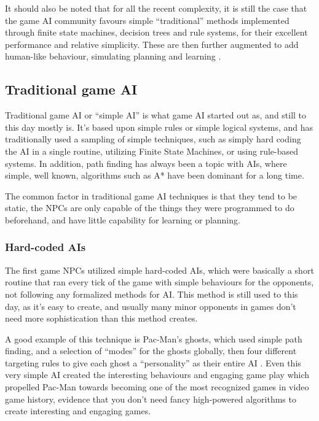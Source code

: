 It should also be noted that for all the recent complexity, it is still the case
that the game AI community favours simple ``traditional'' methods implemented
through finite state machines, decision trees and rule systems, for their
excellent performance and relative simplicity. These are then further augmented
to add human-like behaviour, simulating planning and learning
\citep[see][]{orkin2003applying,isla2002new,khoo2002efficient,mateas2002behavior}.

\subsection{Traditional game AI}
\label{sec:traditional-game-ai}

Traditional game AI or ``simple AI'' is what game AI started out as, and still
to this day mostly is. It's based upon simple rules or simple logical systems,
and has traditionally used a sampling of simple techniques, such as simply hard
coding the AI in a single routine, utilizing Finite State Machines, or using
rule-based systems. In addition, path finding has always been a topic with AIs,
where simple, well known, algorithms such as A* have been dominant for a long
time.

The common factor in traditional game AI techniques is that they tend to be
static, the NPCs are only capable of the things they were programmed to do
beforehand, and have little capability for learning or planning.

\subsubsection{Hard-coded AIs}
\label{sec:hard-coded-ais}

The first game NPCs utilized simple hard-coded AIs, which were basically a short
routine that ran every tick of the game with simple behaviours for the
opponents, not following any formalized methods for AI. This method is still
used to this day, as it's easy to create, and usually many minor opponents in
games don't need more sophistication than this method creates.

A good example of this technique is Pac-Man's ghosts, which used simple path
finding, and a selection of ``modes'' for the ghosts globally, then four
different targeting rules to give each ghost a ``personality'' as their entire
AI \citep{birch2010pacman,pittmanpac}. Even this very simple AI created the
interesting behaviours and engaging game play which propelled Pac-Man towards
becoming one of the most recognized games in video game history, evidence that
you don't need fancy high-powered algorithms to create interesting and engaging
games.

